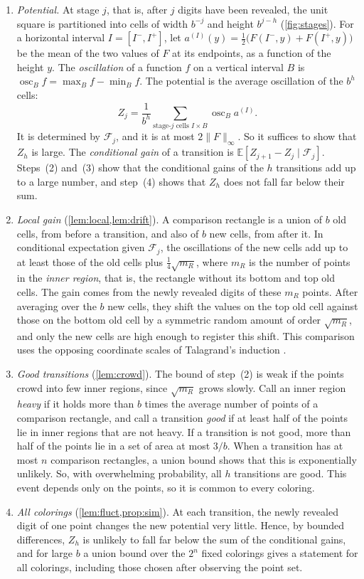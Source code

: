 \documentclass[11pt,letterpaper]{article}
\newcommand{\E}{\mathbb{E}}
\newcommand{\F}{\mathcal{F}}
\newcommand{\1}{\mathbf{1}}
\newcommand{\Fnorm}[1]{\lVert #1\rVert_\infty}
\newcommand{\osc}{\operatorname{osc}}
\begin{document}
\begin{enumerate}[label=(\arabic*),itemsep=2pt]
\item \emph{Potential.} At stage $j$, that is, after $j$ digits have been revealed, the unit square is partitioned into cells of width $b^{-j}$ and height $b^{j-h}$ (\cref{fig:stages}). For a horizontal interval $I=[I^-,I^+]$, let $a^{(I)}(y)=\frac12\bigl(F(I^-,y)+F(I^+,y)\bigr)$ be the mean of the two values of $F$ at its endpoints, as a function of the height $y$. The \emph{oscillation} of a function $f$ on a vertical interval $B$ is $\osc_Bf=\max_Bf-\min_Bf$. The potential is the average oscillation of the $b^h$ cells:
\begin{equation}\label{eq:Zdef}
Z_j=\frac1{b^h}\sum_{\text{stage-$j$ cells }I\times B}\osc_Ba^{(I)}.
\end{equation}
It is determined by $\F_j$, and it is at most $2\Fnorm F$. So it suffices to show that $Z_h$ is large. The \emph{conditional gain} of a transition is $\E[Z_{j+1}-Z_j\mid\F_j]$. Steps~(2) and~(3) show that the conditional gains of the $h$ transitions add up to a large number, and step~(4) shows that $Z_h$ does not fall far below their sum.
\item \emph{Local gain} (\cref{lem:local,lem:drift}). A comparison rectangle is a union of $b$ old cells, from before a transition, and also of $b$ new cells, from after it. In conditional expectation given $\F_j$, the oscillations of the new cells add up to at least those of the old cells plus $\frac14\sqrt{m_R}$, where $m_R$ is the number of points in the \emph{inner region}, that is, the rectangle without its bottom and top old cells. The gain comes from the newly revealed digits of these $m_R$ points. After averaging over the $b$ new cells, they shift the values on the top old cell against those on the bottom old cell by a symmetric random amount of order $\sqrt{m_R}$, and only the new cells are high enough to register this shift. This comparison uses the opposing coordinate scales of Talagrand's induction \cite[Section~3]{Tal94}.
\item \emph{Good transitions} (\cref{lem:crowd}). The bound of step~(2) is weak if the points crowd into few inner regions, since $\sqrt{m_R}$ grows slowly. Call an inner region \emph{heavy} if it holds more than $b$ times the average number of points of a comparison rectangle, and call a transition \emph{good} if at least half of the points lie in inner regions that are not heavy. If a transition is not good, more than half of the points lie in a set of area at most $3/b$. When a transition has at most $n$ comparison rectangles, a union bound shows that this is exponentially unlikely. So, with overwhelming probability, all $h$ transitions are good. This event depends only on the points, so it is common to every coloring.
\item \emph{All colorings} (\cref{lem:fluct,prop:sim}). At each transition, the newly revealed digit of one point changes the new potential very little. Hence, by bounded differences, $Z_h$ is unlikely to fall far below the sum of the conditional gains, and for large $b$ a union bound over the $2^n$ fixed colorings gives a statement for all colorings, including those chosen after observing the point set.
\end{enumerate}
\end{document}
